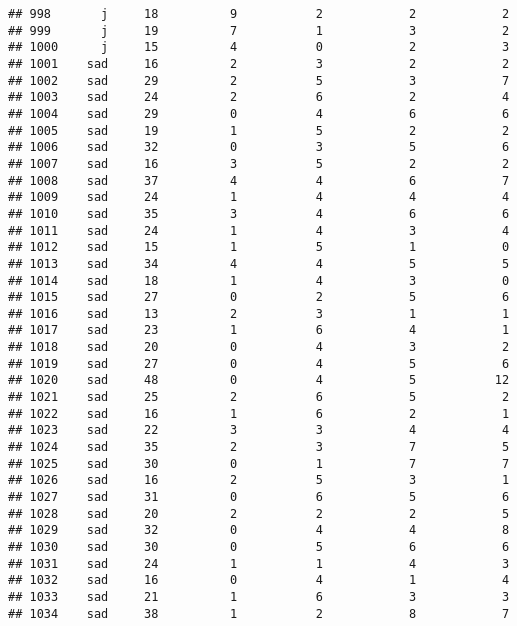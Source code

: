 \documentclass[
]{article}
\begin{document}
\begin{verbatim}
## 998       j     18          9           2            2            2
## 999       j     19          7           1            3            2
## 1000      j     15          4           0            2            3
## 1001    sad     16          2           3            2            2
## 1002    sad     29          2           5            3            7
## 1003    sad     24          2           6            2            4
## 1004    sad     29          0           4            6            6
## 1005    sad     19          1           5            2            2
## 1006    sad     32          0           3            5            6
## 1007    sad     16          3           5            2            2
## 1008    sad     37          4           4            6            7
## 1009    sad     24          1           4            4            4
## 1010    sad     35          3           4            6            6
## 1011    sad     24          1           4            3            4
## 1012    sad     15          1           5            1            0
## 1013    sad     34          4           4            5            5
## 1014    sad     18          1           4            3            0
## 1015    sad     27          0           2            5            6
## 1016    sad     13          2           3            1            1
## 1017    sad     23          1           6            4            1
## 1018    sad     20          0           4            3            2
## 1019    sad     27          0           4            5            6
## 1020    sad     48          0           4            5           12
## 1021    sad     25          2           6            5            2
## 1022    sad     16          1           6            2            1
## 1023    sad     22          3           3            4            4
## 1024    sad     35          2           3            7            5
## 1025    sad     30          0           1            7            7
## 1026    sad     16          2           5            3            1
## 1027    sad     31          0           6            5            6
## 1028    sad     20          2           2            2            5
## 1029    sad     32          0           4            4            8
## 1030    sad     30          0           5            6            6
## 1031    sad     24          1           1            4            3
## 1032    sad     16          0           4            1            4
## 1033    sad     21          1           6            3            3
## 1034    sad     38          1           2            8            7

\end{verbatim}
\end{document}
